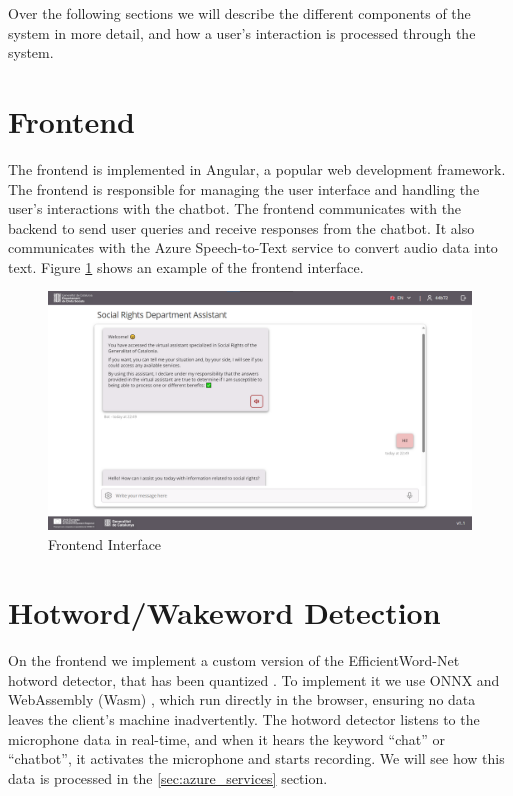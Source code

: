 \documentclass[a4paper,12pt,twoside]{ThesisStyle}
\begin{document}
Over the following sections we will describe the different components of the system in more detail, and how a user's interaction is processed through the system.

\section{Frontend}
\label{sec:frontend}

The frontend is implemented in Angular, a popular web development framework. The frontend is responsible for managing the user interface and handling the user's interactions with the chatbot. The frontend communicates with the backend to send user queries and receive responses from the chatbot. It also communicates with the Azure Speech-to-Text service to convert audio data into text. Figure \ref{fig:frontend} shows an example of the frontend interface.

\begin{figure}[htb]
  \centering
  \includegraphics[width=1\textwidth]{imatges/UI Design.png}
  \caption{Frontend Interface}
  \label{fig:frontend}
\end{figure}


\section{Hotword/Wakeword Detection}
\label{sec:hotword_detection}

On the frontend we implement a custom version of the EfficientWord-Net \cite{Chidhambararajan2022EfficientWordNet} hotword detector, that has been quantized \cite{Zhang2023PostTrainingQuantizationNeuralNetworks}. To implement it we use ONNX \cite{onnx} and WebAssembly (Wasm) \cite{wasm}, which run directly in the browser, ensuring no data leaves the client's machine inadvertently. The hotword detector listens to the microphone data in real-time, and when it hears the keyword ``chat'' or ``chatbot'', it activates the microphone and starts recording. We will see how this data is processed in the \ref{sec:azure_services} section.
\end{document}
